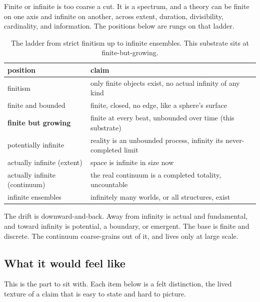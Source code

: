 Finite or infinite is too coarse a cut. It is a spectrum, and a theory can be finite on one axis and infinite on another, across extent, duration, divisibility, cardinality, and information. The positions below are rungs on that ladder.

\begin{table}[ht]
\centering
\begin{tabular}{@{}ll@{}}
\toprule
position & claim \\
\midrule
finitism & only finite objects exist, no actual infinity of any kind \\
finite and bounded & finite, closed, no edge, like a sphere's surface \\
\textbf{finite but growing} & finite at every beat, unbounded over time (this substrate) \\
potentially infinite & reality is an unbounded process, infinity its never-completed limit \\
actually infinite (extent) & space is infinite in size now \\
actually infinite (continuum) & the real continuum is a completed totality, uncountable \\
infinite ensembles & infinitely many worlds, or all structures, exist \\
\bottomrule
\end{tabular}
\caption{The ladder from strict finitism up to infinite ensembles. This substrate sits at finite-but-growing.}
\label{tab:infinity-ladder}
\end{table}

The drift is downward-and-back. Away from infinity is actual and fundamental, and toward infinity is potential, a boundary, or emergent. The base is finite and discrete. The continuum coarse-grains out of it, and lives only at large scale.

\subsection{What it would feel like}

This is the part to sit with. Each item below is a felt distinction, the lived texture of a claim that is easy to state and hard to picture.

